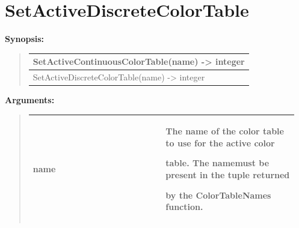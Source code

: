 \documentclass[letterpaper,10pt,english]{sphinxmanual}
\begin{document}
\section{SetActiveDiscreteColorTable}
\label{functions:setactivediscretecolortable}
\begin{DUlineblock}{0em}
\item[] \textbf{Synopsis:}
\end{DUlineblock}
\begin{quote}

\begin{tabulary}{\linewidth}{|L|}
\hline

SetActiveContinuousColorTable(name) -\textgreater{} integer
\\
\hline
SetActiveDiscreteColorTable(name) -\textgreater{} integer
\\
\hline\end{tabulary}

\end{quote}

\begin{DUlineblock}{0em}
\item[] 
\item[] \textbf{Arguments:}
\end{DUlineblock}
\begin{quote}

\begin{tabular}{|p{0.475\linewidth}|p{0.475\linewidth}|}
\hline

name
 & 
\begin{DUlineblock}{0em}
\item[] The name of the color table to use for the active color
\item[] table. The namemust be present in the tuple returned
\item[] by the ColorTableNames function.
\end{DUlineblock}
\\
\hline\end{tabular}

\end{quote}
\end{document}
